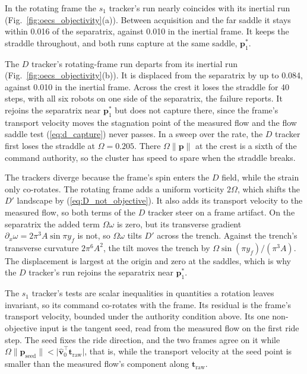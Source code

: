 \documentclass[lettersize,journal]{IEEEtran}
\begin{document}
In the rotating frame the $s_1$ tracker's run nearly coincides with its
inertial run (Fig.~\ref{fig:oecs_objectivity}(a)). Between acquisition and
the far saddle it stays within 0.016 of the separatrix, against 0.010 in
the inertial frame. It keeps the straddle throughout, and both runs capture
at the same saddle, $\mathbf{p}_1^*$.

The $D$ tracker's rotating-frame run departs from its inertial run
(Fig.~\ref{fig:oecs_objectivity}(b)). It is displaced from the separatrix
by up to 0.084, against 0.010 in the inertial frame. Across the crest it
loses the straddle for 40 steps, with all six robots on one side of the
separatrix, the failure \cite{26} reports. It rejoins the separatrix near
$\mathbf{p}_1^*$ but does not capture there, since the frame's transport
velocity moves the stagnation point of the measured flow and the flow
saddle test (\ref{eq:d_capture}) never passes. In a sweep over the rate,
the $D$ tracker first loses the straddle at $\Omega = 0.205$. There
$\Omega\lVert\mathbf{p}\rVert$ at
the crest is a sixth of the command authority, so the cluster has speed to
spare when the straddle breaks.

The trackers diverge because the frame's spin enters the $D$ field, while
the strain only co-rotates. The rotating frame adds a uniform vorticity $2\Omega$, which
shifts the $D'$ landscape by (\ref{eq:D_not_objective}). It also adds its
transport velocity to the measured flow, so both terms of the $D$ tracker
steer on a frame artifact. On the separatrix the added term
$\Omega\omega$ is zero, but its transverse gradient
$\partial_x\omega = 2\pi^3 A\sin\pi y_f$ is not, so $\Omega\omega$ tilts
$D'$ across the trench. Against the trench's transverse curvature
$2\pi^6 A^2$, the tilt moves the trench by
$\Omega\sin(\pi y_f)/(\pi^3 A)$. The displacement is largest at the origin
and zero at the saddles, which is why the $D$ tracker's run rejoins the
separatrix near $\mathbf{p}_1^*$.

The $s_1$ tracker's tests are scalar inequalities in quantities a rotation
leaves invariant, so its command co-rotates with the frame. Its residual is
the frame's transport velocity, bounded under the authority condition above. Its one non-objective input is the tangent
seed, read from the measured flow on the first ride step. The seed fixes
the ride direction, and the two frames agree on it while
$\Omega\lVert\mathbf{p}_{\text{seed}}\rVert <
\lvert\hat{\mathbf{v}}_0^\top\mathbf{t}_{\text{raw}}\rvert$, that is, while
the transport velocity at the seed point is smaller than the measured
flow's component along $\mathbf{t}_{\text{raw}}$.
\end{document}
